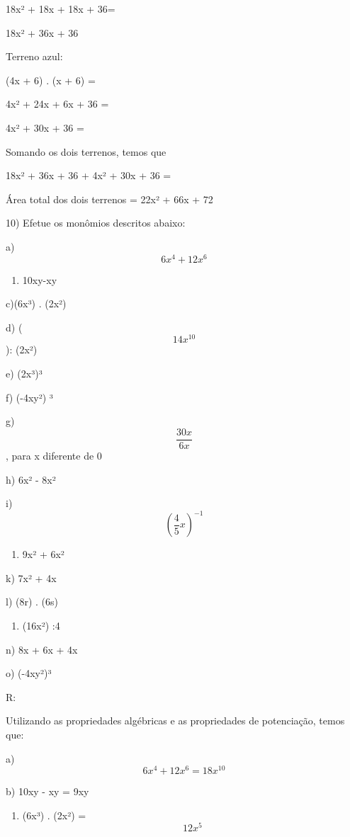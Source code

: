 18x² + 18x + 18x + 36=

18x² + 36x + 36

Terreno azul:

(4x + 6) . (x + 6) =

4x² + 24x + 6x + 36 =

4x² + 30x + 36 =

Somando os dois terrenos, temos que

18x² + 36x + 36 + 4x² + 30x + 36 =

Área total dos dois terrenos = 22x² + 66x + 72

10) Efetue os monômios descritos abaixo:

a) \[6x^4+ 12x^6\]

\begin{enumerate}
\def\labelenumi{\alph{enumi})}
\setcounter{enumi}{1}
\tightlist
\item
  10xy-xy
\end{enumerate}

c)(6x³) . (2x²)

d) (\[14x^{10}\]): (2x²)

e) (2x³)³

f) (-4xy²) ³

g) \[\frac{30x}{6x}\], para x diferente de 0

h) 6x² - 8x²

i)\[(\frac{4}{5}x)^{-1}\]

\begin{enumerate}
\def\labelenumi{\alph{enumi})}
\setcounter{enumi}{9}
\tightlist
\item
  9x² + 6x²
\end{enumerate}

k) 7x² + 4x

l) (8r) . (6s)

\begin{enumerate}
\def\labelenumi{\alph{enumi})}
\setcounter{enumi}{12}
\tightlist
\item
  (16x²) :4
\end{enumerate}

n) 8x + 6x + 4x

o) (-4xy²)³

R:

Utilizando as propriedades algébricas e as propriedades de potenciação,
temos que:

a) \[6x^4 + 12x^6 = 18x^{10}\]

b) 10xy - xy = 9xy

\begin{enumerate}
\def\labelenumi{\alph{enumi})}
\setcounter{enumi}{2}
\tightlist
\item
  (6x³) . (2x²) = \[12x^5\]
\end{enumerate}

